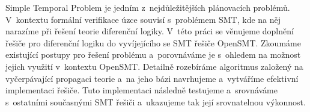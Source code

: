\documentclass[12pt]{report}
\begin{document}
Simple Temporal Problem je jedním z~nejdůležitějších plánovacích problémů. V~kontextu formální verifikace úzce souvisí s~problémem SMT, kde na něj narazíme při řešení teorie diferenční logiky. V~této práci se věnujeme doplnění řešiče pro diferenční logiku do vyvíjejícího se SMT řešiče OpenSMT. Zkoumáme existující postupy pro řešení problému a~porovnáváme je s~ohledem na možnost jejich využití v~kontextu OpenSMT. Detailně rozebíráme algoritmus založený na vyčerpávající propagaci teorie a~na jeho bázi navrhujeme a~vytváříme efektivní implementaci řešiče. Tuto implementaci následně testujeme a~srovnáváme s~ostatními současnými SMT řešiči a~ukazujeme tak její srovnatelnou výkonnost.
\end{document}
